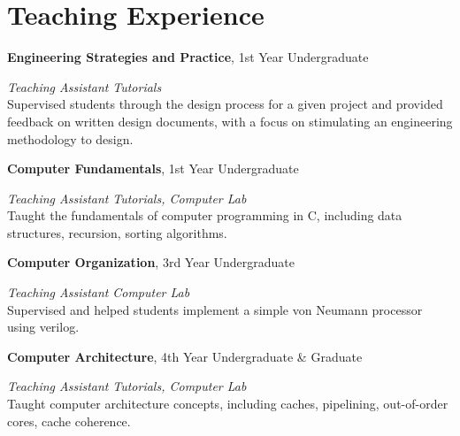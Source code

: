 \section{\sc Teaching Experience}

{\bf Engineering Strategies and Practice}, 1st Year Undergraduate
\vspace{-.3cm}

{\em Teaching Assistant} \hfill {\em Tutorials}\\
Supervised students through the design process for a given project and provided feedback on written design documents, 
with a focus on stimulating an engineering methodology to design.

{\bf Computer Fundamentals}, 1st Year Undergraduate
\vspace{-.3cm}

{\em Teaching Assistant} \hfill {\em Tutorials, Computer Lab}\\
Taught the fundamentals of computer programming in C, including data structures, recursion, sorting algorithms.

{\bf Computer Organization}, 3rd Year Undergraduate
\vspace{-.3cm}

{\em Teaching Assistant} \hfill {\em Computer Lab}\\
Supervised and helped students implement a simple von Neumann processor using verilog.

{\bf Computer Architecture}, 4th Year Undergraduate \& Graduate
\vspace{-.3cm}

{\em Teaching Assistant} \hfill {\em Tutorials, Computer Lab}\\
Taught computer architecture concepts, including caches, pipelining, out-of-order cores, cache coherence.
